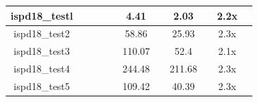 \begin{table}[!htbp]
\begin{tabular}{|c|lllc|cccl|cl|}
    ispd18\_testl                   & \multicolumn{1}{l|}{}   & \multicolumn{1}{l|}{}   & \multicolumn{1}{l|}{}                                                   &                                                    & \multicolumn{1}{c|}{4.41}   & \multicolumn{1}{c|}{}   & \multicolumn{1}{c|}{2.03}                                               &                                                                         & \multicolumn{1}{c|}{2.2x}                                               &                                                                         \\ \hline
    ispd18\_test2                   & \multicolumn{1}{l|}{}   & \multicolumn{1}{l|}{}   & \multicolumn{1}{l|}{}                                                   &                                                    & \multicolumn{1}{c|}{58.86}  & \multicolumn{1}{c|}{}   & \multicolumn{1}{c|}{25.93}                                              &                                                                         & \multicolumn{1}{c|}{2.3x}                                               &                                                                         \\ \hline
    ispd18\_test3                   & \multicolumn{1}{l|}{}   & \multicolumn{1}{l|}{}   & \multicolumn{1}{l|}{}                                                   &                                                    & \multicolumn{1}{c|}{110.07} & \multicolumn{1}{c|}{}   & \multicolumn{1}{c|}{52.4}                                               &                                                                         & \multicolumn{1}{c|}{2.1x}                                               &                                                                         \\ \hline
    ispd18\_test4                   & \multicolumn{1}{l|}{}   & \multicolumn{1}{l|}{}   & \multicolumn{1}{l|}{}                                                   &                                                    & \multicolumn{1}{c|}{244.48} & \multicolumn{1}{c|}{}   & \multicolumn{1}{c|}{211.68}                                             &                                                                         & \multicolumn{1}{c|}{2.3x}                                               &                                                                         \\ \hline
    ispd18\_test5                   & \multicolumn{1}{l|}{}   & \multicolumn{1}{l|}{}   & \multicolumn{1}{l|}{}                                                   &                                                    & \multicolumn{1}{c|}{109.42} & \multicolumn{1}{c|}{}   & \multicolumn{1}{c|}{40.39}                                              &                                                                         & \multicolumn{1}{c|}{2.3x}                                               &                                                                         \\ \hline

\end{tabular}
\end{table}
